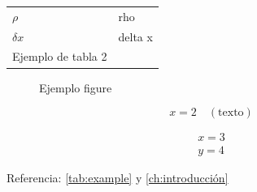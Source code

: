 \begin{tabular}{ll}
$\rho$       & rho \\
$ \delta x$  & delta x \\
Ejemplo de tabla 2 &
\end{tabular}


\begin{figure}[h]
  \myfloatalign
   \quad
  \caption[Ejemplo figure]{Ejemplo figure}\label{fig:example}
\end{figure}

\begin{equation}
  x = 2 \quad (\textrm{texto})
\end{equation}

\begin{eqnarray*}
  x = 3 \\
  y = 4
\end{eqnarray*}

Referencia: \autoref{tab:example} y \autoref{ch:introducción}

\clearpage %
